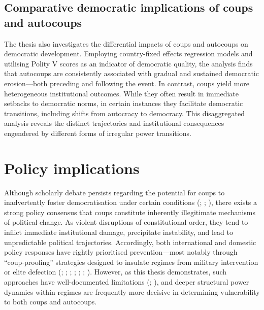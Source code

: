 \documentclass[
  12pt,
]{report}
\begin{document}
\subsection*{Comparative democratic implications of coups and
autocoups}\label{comparative-democratic-implications-of-coups-and-autocoups}

The thesis also investigates the differential impacts of coups and
autocoups on democratic development. Employing country-fixed effects
regression models and utilising Polity V scores as an indicator of
democratic quality, the analysis finds that autocoups are consistently
associated with gradual and sustained democratic erosion---both
preceding and following the event. In contrast, coups yield more
heterogeneous institutional outcomes. While they often result in
immediate setbacks to democratic norms, in certain instances they
facilitate democratic transitions, including shifts from autocracy to
democracy. This disaggregated analysis reveals the distinct trajectories
and institutional consequences engendered by different forms of
irregular power transitions.

\section{Policy implications}\label{policy-implications}

Although scholarly debate persists regarding the potential for coups to
inadvertently foster democratisation under certain conditions
(;
;
), there exists a strong policy
consensus that coups constitute inherently illegitimate mechanisms of
political change. As violent disruptions of constitutional order, they
tend to inflict immediate institutional damage, precipitate instability,
and lead to unpredictable political trajectories. Accordingly, both
international and domestic policy responses have rightly prioritised
prevention---most notably through ``coup-proofing'' strategies designed
to insulate regimes from military intervention or elite defection
(;
;
;
;
;
;
). However, as this thesis
demonstrates, such approaches have well-documented limitations
(;
), and deeper structural power
dynamics within regimes are frequently more decisive in determining
vulnerability to both coups and autocoups.
\end{document}
